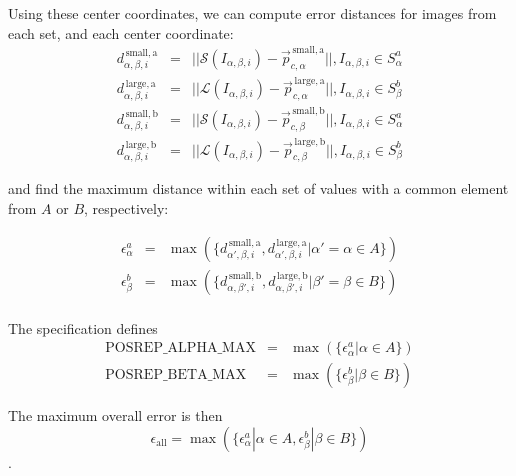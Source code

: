 \documentclass[11pt,a4paper]{scrartcl}
\begin{document}
Using these center coordinates, we can compute error distances for
images from each set, and each center coordinate:
\begin{eqnarray}
  d^\mathrm{\,small,a}_{\alpha,\beta,i} & = & ||\mathcal{S}(I_{\alpha,\beta,i}) - \vec{p}_{c,\alpha}^\mathrm{\,small,a} ||,  I_{\alpha,\beta,i} \in S^a_\alpha \\
  d^\mathrm{\,large,a}_{\alpha,\beta,i} & = & ||\mathcal{L}(I_{\alpha,\beta,i}) - \vec{p}_{c,\alpha}^\mathrm{\,large,a} ||,  I_{\alpha,\beta,i} \in S^b_\beta  \\
  d^\mathrm{\,small,b}_{\alpha,\beta,i} & = & ||\mathcal{S}(I_{\alpha,\beta,i}) - \vec{p}_{c,\beta}^\mathrm{\,small,b} ||,   I_{\alpha,\beta,i} \in S^a_\alpha \\
  d^\mathrm{\,large,b}_{\alpha,\beta,i} & = & ||\mathcal{L}(I_{\alpha,\beta,i}) - \vec{p}_{c,\beta}^\mathrm{\,large,b} ||,   I_{\alpha,\beta,i} \in S^b_\beta
\end{eqnarray}

and find the maximum distance within each set of values with a common element from $A$ or $B$, respectively:

\begin{eqnarray}
\epsilon^{a}_\alpha & = & \max(\{ d^\mathrm{\,small,a}_{\alpha',\beta,i}, d^\mathrm{\,large,a}_{\alpha',\beta,i} | \alpha' = \alpha \in A \}) \\
\epsilon^{b}_\beta & = & \max(\{ d^\mathrm{\,small,b}_{\alpha,\beta',i}, d^\mathrm{\,large,b}_{\alpha,\beta',i} | \beta' = \beta \in B \}) \\
\end{eqnarray}

The specification defines
\begin{eqnarray}
  \mathrm{POSREP\_ALPHA\_MAX} & = &  \max(\{ \epsilon^{a}_\alpha | \alpha \in A \}) \\
  \mathrm{POSREP\_BETA\_MAX} & = & \max(\{ \epsilon^{b}_\beta | \beta \in B \})
\end{eqnarray}


The maximum overall error is then
\begin{equation}
  \epsilon_\mathrm{all} = \max(\{\epsilon^{a}_\alpha | \alpha \in A, \epsilon^{b}_\beta | \beta \in B \})
\end{equation}.

\end{document}
